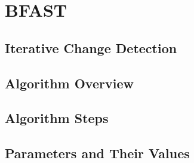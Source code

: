 \documentclass[main.tex]{subfiles}
\begin{document}
\chapter{BFAST}
\label{chap:bfast}


\section{Iterative Change Detection}
\label{sec:iterative_change_detection}
\section{Algorithm Overview}
\label{sec:bfast_algorithm_overview}
\section{Algorithm Steps}
\label{sec:algorithm_steps}
\section{Parameters and Their Values}
\label{sec:bfast_params}

\biblio
\end{document}
